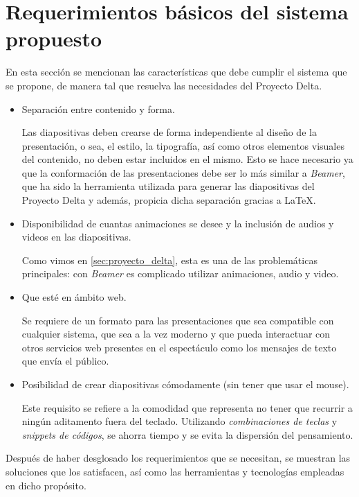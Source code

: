	\section{Requerimientos básicos del sistema propuesto} %
	\label{sec:requerimientos_basicos_del_sistema_propuesto}
		En esta sección se mencionan las características que debe cumplir el sistema que se propone, de manera tal que resuelva las necesidades del Proyecto Delta.
		\begin{itemize}
				\item Separación entre contenido y forma. 

					Las diapositivas deben crearse de forma independiente al diseño de la presentación, o sea, el estilo, la tipografía, así como otros elementos visuales del contenido, no deben estar incluidos en el mismo. Esto se hace necesario ya que la conformación de las presentaciones debe ser lo más similar a \textit{Beamer}, que ha sido la herramienta utilizada para generar las diapositivas del Proyecto Delta y además, propicia dicha separación gracias a \LaTeX{}.

				\item Disponibilidad de cuantas animaciones se desee y la inclusión de audios y videos en las diapositivas. 

					Como vimos en \ref{sec:proyecto_delta}, esta es una de las problemáticas principales: con \textit{Beamer} es complicado utilizar animaciones, audio y video.

				\item Que esté en ámbito web. 

					Se requiere de un formato para las presentaciones que sea compatible con cualquier sistema, que sea a la vez moderno y que pueda interactuar con otros servicios web presentes en el espectáculo como los mensajes de texto que envía el público.


				\item Posibilidad de crear diapositivas cómodamente (sin tener que usar el mouse). 

					Este requisito se refiere a la comodidad que representa no tener que recurrir a ningún aditamento fuera del teclado. Utilizando \textit{combinaciones de teclas} y \textit{snippets de códigos}, se ahorra tiempo y se evita la dispersión del pensamiento.
		\end{itemize}	


	Después de haber desglosado los requerimientos que se necesitan, se muestran las soluciones que los satisfacen, así como las herramientas y tecnologías empleadas en dicho propósito. 

